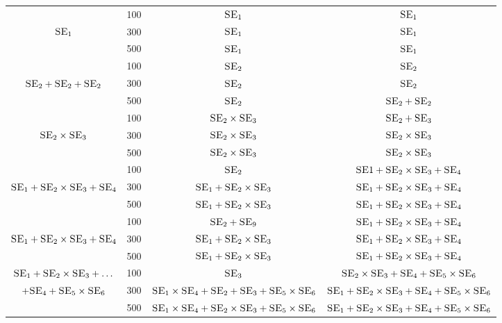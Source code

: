 \documentclass[a4paper,12pt ]{report}
\begin{document}
\begin{table}[h]
\begin{center}
{\begin{tabular}{|c |  c |  c | c | }
&\small100& \small $\SE_{1}$ &\small$\SE_{1}$ \\
\small$\SE_{1} $ & \small300& \small$\SE_{1}$ &$\SE_{1}$ \\
& 500& $\SE_{1}$ &$\SE_{1}$ \\ \hline
&100& $\SE_{2}$ &$\SE_{2}$ \\
$\SE_{2} + \SE_{2} + \SE_{2} $& 300& $\SE_{2}$ &$\SE_{2}$ \\
& 500& $\SE_{2}$ &$\SE_{2} + \SE_{2}$ \\ \hline
 &100& $\SE_{2} \times \SE_{3}$ &$\SE_{2} + \SE_{3}$ \\
$\SE_{2} \times \SE_{3} $& 300& $\SE_{2} \times \SE_{3}$ &$\SE_{2} \times \SE_{3}$ \\
& 500& $\SE_{2} \times \SE_{3}$ &$\SE_{2} \times \SE_{3}$ \\ \hline
&100& $\SE_{2}$ &$\SE{1} + \SE_{2} \times \SE_{3} + \SE_{4}$ \\
$\SE_{1} + \SE_{2} \times \SE_{3} + \SE_{4} $ & 300& $\SE_{1} + \SE_{2} \times \SE_{3}$ &$\SE_{1} + \SE_{2} \times \SE_{3} + \SE_{4}$ \\
& 500& $\SE_{1} + \SE_{2} \times \SE_{3}$ &$\SE_{1} + \SE_{2} \times \SE_{3} + \SE_{4}$ \\ \hline
&100& $\SE_{2} + \SE_{9}$ &$\SE_{1} + \SE_{2} \times \SE_{3} + \SE_{4}$ \\
$\SE_{1} + \SE_{2} \times \SE_{3} + \SE_{4} $ & 300& $\SE_{1} + \SE_{2} \times \SE_{3}$ &$\SE_{1} + \SE_{2} \times \SE_{3} + \SE_{4}$ \\
& 500& $\SE_{1} + \SE_{2} \times \SE_{3}$ &$\SE_{1} + \SE_{2} \times \SE_{3} + \SE_{4}$ \\ \hline
$\SE_{1} + \SE_{2} \times \SE_{3} + \ldots$&100& $\SE_{3}$ &$\SE_{2} \times \SE_{3} + \SE_{4} + \SE_{5} \times \SE_{6}$ \\
$ + \SE_{4} + \SE_{5} \times \SE_{6} $ & 300& $\SE_{1} \times \SE_{4} + \SE_{2} + \SE_{3} + \SE_{5} \times \SE_{6}$ &$\SE_{1} + \SE_{2} \times \SE_{3} + \SE_{4} + \SE_{5} \times \SE_{6}$ \\
& 500& $\SE_{1} \times \SE_{4} + \SE_{2} \times \SE_{3} + \SE_{5} \times \SE_{6}$ &$\SE_{1} + \SE_{2} \times \SE_{3} + \SE_{4} + \SE_{5} \times \SE_{6}$ \\ \hline

\end{tabular}}
\end{center}
\end{table}
\end{document}
